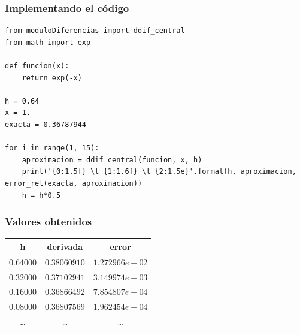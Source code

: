\documentclass[12pt]{beamer}
\begin{document}
\begin{frame}
\frametitle{Implementando el código}
\begin{lstlisting}[caption=Código para obtener la aproximación de la segunda derivada]
from moduloDiferencias import ddif_central
from math import exp

def funcion(x):
    return exp(-x)

h = 0.64
x = 1.
exacta = 0.36787944

for i in range(1, 15):
    aproximacion = ddif_central(funcion, x, h)
    print('{0:1.5f} \t {1:1.6f} \t {2:1.5e}'.format(h, aproximacion, error_rel(exacta, aproximacion))
    h = h*0.5
\end{lstlisting}
\end{frame}
\begin{frame}
\frametitle{Valores obtenidos}
\begin{table}
\renewcommand{\arraystretch}{0.9}
\centering
\begin{tabular}{c c c}
h & derivada & error \\ \hline
$0.64000$ & $0.38060910$ & $1.272966e-02$ \\ \hline
$0.32000$ & $0.37102941$ & $3.149974e-03$ \\ \hline
$0.16000$ & $0.36866492$ & $7.854807e-04$ \\ \hline
$0.08000$ & $0.36807569$ & $1.962454e-04$ \\ \hline
\ldots & \ldots & \ldots \\ \hline
\end{tabular}    
\end{table}
\end{frame}
\end{document}

